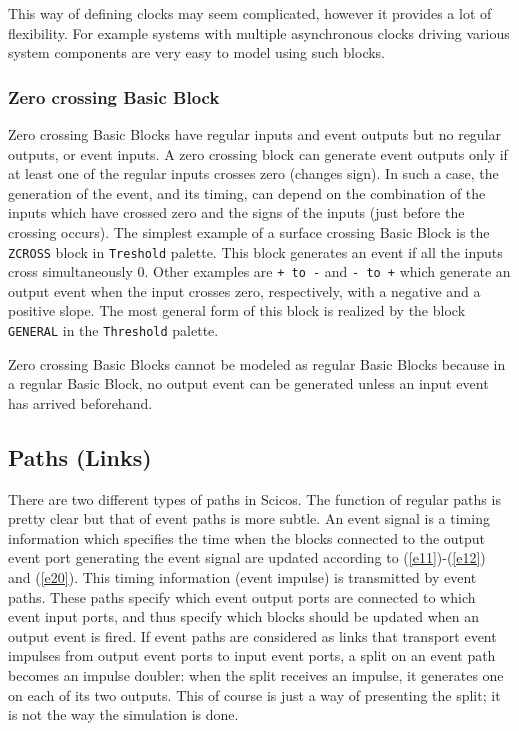 

This way of defining clocks may seem complicated, however it provides
a lot of flexibility. For example systems with  multiple asynchronous
clocks driving various system components are very easy to model using
such blocks. 

\subsubsection{Zero crossing Basic Block}
Zero crossing Basic Blocks have regular inputs and event outputs but
no regular outputs, or event inputs. A zero crossing block can
generate event outputs only if at least one of the regular inputs crosses
zero (changes sign). In such a case, the generation of the event, and
its timing, can depend on the combination of the inputs which have
crossed zero and the signs of the inputs (just before the crossing
occurs). The simplest example of a surface crossing Basic Block is the
{\tt ZCROSS} block in {\tt Treshold} palette. This block generates an 
event if all the inputs cross simultaneously 0. Other examples are
{\tt + to -} and {\tt - to +} which generate an output event when the
input crosses zero, respectively, with a negative and a positive
slope. The most general form of this block is realized by the block
{\tt GENERAL} in the {\tt Threshold} palette. 

Zero crossing Basic Blocks cannot be modeled as regular Basic Blocks
because in a regular Basic Block, no output event can be generated
unless an input event has arrived beforehand.



\subsection{Paths (Links)}
There are two different types of paths in Scicos. The function of regular
paths is pretty clear but that of event paths is more subtle. An event
signal is a timing information which specifies the time when the
blocks connected to the output event port generating the event signal
are updated according to (\ref{e11})-(\ref{e12}) and (\ref{e20}). This
timing information (event impulse) is transmitted by event
paths. These paths specify which event output ports are connected to
which event input ports, and thus specify which blocks should be
updated when an output event is fired. If event paths are considered
as links that transport event impulses from output event ports to
input event ports, a split on an event path becomes an impulse
doubler: when the split receives an impulse, it generates one on each
of its two outputs. This of course is just a way of presenting the
split; it is not the way the simulation is done.

